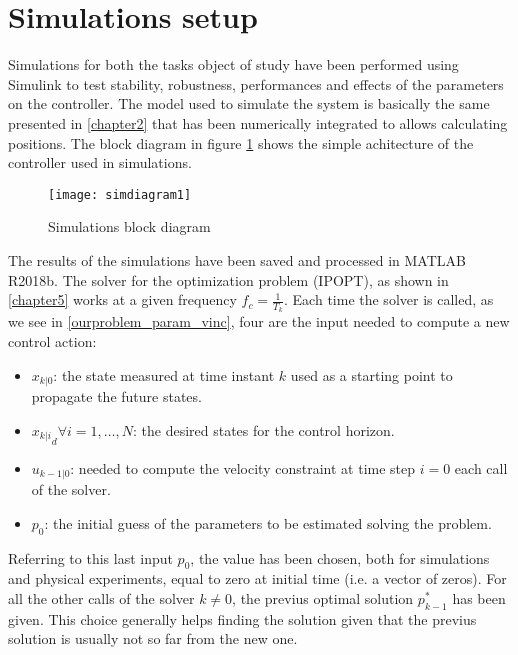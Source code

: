 \section{Simulations setup}

	Simulations for both the tasks object of study have been performed using Simulink to test stability, robustness, performances and effects of the parameters on the controller. The model used to simulate the system is basically the same presented in \ref{chapter2} that has been numerically integrated to allows calculating positions. The block diagram in figure \ref{simdiagram1} shows the simple achitecture of the controller used in simulations.

	\begin{figure}[h!]
	\begin{center} 
		\texttt{[image: simdiagram1]}
		\centering
		\label{simdiagram1}
		\caption{Simulations block diagram} 
	\end{center}
	\end{figure}

	The results of the simulations have been saved and processed in MATLAB R2018b. The solver for the optimization problem (IPOPT), as shown in \ref{chapter5} works at a given frequency $f_c=\frac{1}{T_k}$. Each time the solver is called, as we see in \ref{ourproblem_param_vinc}, four are the input needed to compute a new control action: 
	\begin{itemize}
	\item $x_{k|0}$: the state measured at time instant $k$ used as a starting point to propagate the future states.
	\item ${x_{k|i}}_d \forall i=1,\dots,N$: the desired states for the control horizon.
	\item $u_{k-1|0}$: needed to compute the velocity constraint at time step $i=0$ each call of the solver.
	\item $p_0$: the initial guess of the parameters to be estimated solving the problem. 
	\end{itemize}
	Referring to this last input $p_0$, the value has been chosen, both for simulations and physical experiments, equal to zero at initial time (i.e. a vector of zeros). For all the other calls of the solver $k\neq0$, the previus optimal solution $p_{k-1}^*$ has been given. This choice generally helps finding the solution given that the previus solution is usually not so far from the new one.
